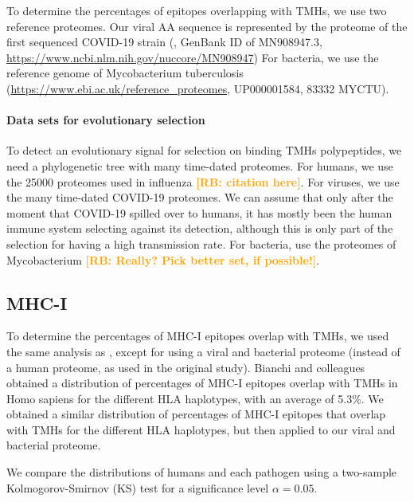 \documentclass{article}
\newcommand{\richel}[1]{\textcolor{orange}{\textbf{[RB: #1]}}}
\begin{document}
To determine the percentages of epitopes overlapping
with TMHs, we use two reference proteomes.
Our viral AA sequence is represented by
the proteome of the first sequenced COVID-19 strain (\cite{wu2020new},
GenBank ID of MN908947.3, \url{https://www.ncbi.nlm.nih.gov/nuccore/MN908947})
For bacteria, we use the reference genome of 
Mycobacterium tuberculosis (\url{https://www.ebi.ac.uk/reference_proteomes}, UP000001584, 
83332 MYCTU).

\paragraph{Data sets for evolutionary selection}

To detect an evolutionary signal for selection on binding
TMHs polypeptides, we need a phylogenetic tree with 
many time-dated proteomes.
For humans, we use the 25000 proteomes used in influenza \richel{citation here}.
For viruses, we use the many time-dated COVID-19 proteomes.
We can assume that only after the moment that COVID-19 spilled over 
to humans, it has mostly been the human immune system selecting against
its detection, although this is only part of the selection for 
having a high transmission rate.
For bacteria, use the proteomes of Mycobacterium 
\richel{Really? Pick better set, if possible!}.

\subsection{MHC-I}

To determine the percentages of MHC-I epitopes overlap
with TMHs, we used the same 
analysis as \cite{bianchi2017},
except for using a viral and bacterial proteome (instead 
of a human proteome, as used in the original study).
Bianchi and colleagues obtained a distribution of 
percentages of MHC-I epitopes overlap with TMHs in Homo sapiens
for the different HLA haplotypes, with an average of 5.3\%.
We obtained a similar distribution of percentages of MHC-I epitopes that 
overlap with TMHs for the different HLA haplotypes, but then applied to
our viral and bacterial proteome.

We compare the distributions of humans and each pathogen
using a two-sample Kolmogorov-Smirnov (KS) test
for a significance level $\alpha = 0.05$.

\end{document}
